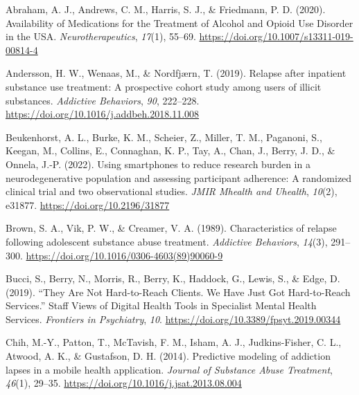 \documentclass[
  letterpaper,
  DIV=11,
  numbers=noendperiod]{scrartcl}
\newlength{\cslhangindent}
\newenvironment{CSLReferences}[2] %
 {\begin{list}{}{%
  \setlength{\itemindent}{0pt}
  \setlength{\leftmargin}{0pt}
  \setlength{\parsep}{0pt}
  \ifodd #1
   \setlength{\leftmargin}{\cslhangindent}
   \setlength{\itemindent}{-1\cslhangindent}
  \fi
  \setlength{\itemsep}{#2\baselineskip}}}
 {\end{list}}
\begin{document}
\newpage

\label{refs}
\begin{CSLReferences}{1}{0}
Abraham, A. J., Andrews, C. M., Harris, S. J., \& Friedmann, P. D.
(2020). Availability of {Medications} for the {Treatment} of {Alcohol}
and {Opioid Use Disorder} in the {USA}. \emph{Neurotherapeutics},
\emph{17}(1), 55--69. \url{https://doi.org/10.1007/s13311-019-00814-4}

Andersson, H. W., Wenaas, M., \& Nordfjærn, T. (2019). Relapse after
inpatient substance use treatment: {A} prospective cohort study among
users of illicit substances. \emph{Addictive Behaviors}, \emph{90},
222--228. \url{https://doi.org/10.1016/j.addbeh.2018.11.008}

Beukenhorst, A. L., Burke, K. M., Scheier, Z., Miller, T. M., Paganoni,
S., Keegan, M., Collins, E., Connaghan, K. P., Tay, A., Chan, J., Berry,
J. D., \& Onnela, J.-P. (2022). Using smartphones to reduce research
burden in a neurodegenerative population and assessing participant
adherence: {A} randomized clinical trial and two observational studies.
\emph{JMIR Mhealth and Uhealth}, \emph{10}(2), e31877.
\url{https://doi.org/10.2196/31877}

Brown, S. A., Vik, P. W., \& Creamer, V. A. (1989). Characteristics of
relapse following adolescent substance abuse treatment. \emph{Addictive
Behaviors}, \emph{14}(3), 291--300.
\url{https://doi.org/10.1016/0306-4603(89)90060-9}

Bucci, S., Berry, N., Morris, R., Berry, K., Haddock, G., Lewis, S., \&
Edge, D. (2019). {``{They Are Not Hard-to-Reach Clients}. {We Have Just
Got Hard-to-Reach Services}.''} {Staff Views} of {Digital Health Tools}
in {Specialist Mental Health Services}. \emph{Frontiers in Psychiatry},
\emph{10}. \url{https://doi.org/10.3389/fpsyt.2019.00344}

Chih, M.-Y., Patton, T., McTavish, F. M., Isham, A. J., Judkins-Fisher,
C. L., Atwood, A. K., \& Gustafson, D. H. (2014). Predictive modeling of
addiction lapses in a mobile health application. \emph{Journal of
Substance Abuse Treatment}, \emph{46}(1), 29--35.
\url{https://doi.org/10.1016/j.jsat.2013.08.004}


\end{CSLReferences}
\end{document}
